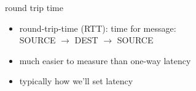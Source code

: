 \begin{frame}{round trip time}
    \begin{itemize}
    \item round-trip-time (RTT): time for message:  \\ SOURCE $\rightarrow$ DEST $\rightarrow$ SOURCE
    \vspace{.5cm}
    \item much easier to measure than one-way latency
    \item typically how we'll set latency
    \end{itemize}
\end{frame}
